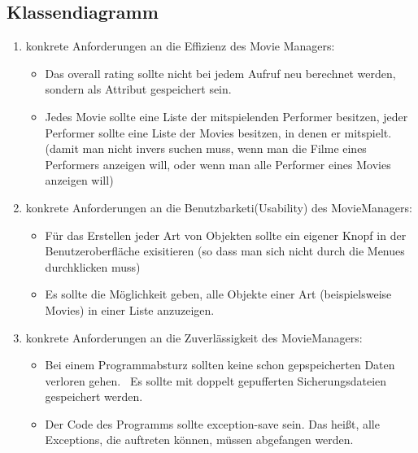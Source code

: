 \documentclass[ngerman]{scrartcl}
\title{\mytitle}
\author{\myauthor}
\newcommand{\blattnummer}{8}												%
\newcommand{\aufgabe}{4}
\begin{document}
	\setcounter{section}{\blattnummer}
	\setcounter{subsection}{\aufgabe-1}
	\subsection{Klassendiagramm}
	\setcounter{subsubsection}{0}

	\begin{enumerate}
		\item konkrete Anforderungen an die Effizienz des Movie Managers:
			\begin{itemize}
				\item Das overall rating sollte nicht bei jedem Aufruf neu berechnet werden, sondern als Attribut gespeichert sein.
				\item Jedes Movie sollte eine Liste der mitspielenden Performer besitzen, jeder Performer sollte eine Liste der Movies besitzen, in denen er mitspielt. (damit man nicht invers suchen muss, wenn man die Filme eines Performers anzeigen will, oder wenn man alle Performer eines Movies anzeigen will)
			\end{itemize}
		\item konkrete Anforderungen an die Benutzbarketi(Usability) des MovieManagers:
			\begin{itemize}
				\item Für das Erstellen jeder Art von Objekten sollte ein eigener Knopf in der Benutzeroberfläche exisitieren (so dass man sich nicht durch die Menues durchklicken muss)
				\item Es sollte die Möglichkeit geben, alle Objekte einer Art (beispielsweise Movies) in einer Liste anzuzeigen.
			\end{itemize}
		\item konkrete Anforderungen an die Zuverlässigkeit des MovieManagers:
			\begin{itemize}
				\item Bei einem Programmabsturz sollten keine schon gepspeicherten Daten verloren gehen. \textrightarrow ~Es sollte mit doppelt gepufferten Sicherungsdateien gespeichert werden.
				\item Der Code des Programms sollte exception-save sein. Das heißt, alle Exceptions, die auftreten können, müssen abgefangen werden.
			\end{itemize}
	\end{enumerate}
\end{document}
